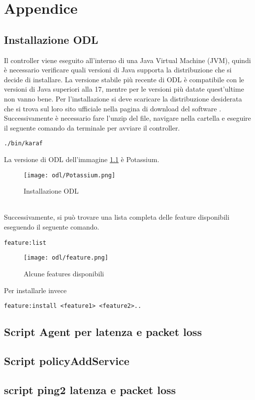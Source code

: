\chapter{Appendice}

\section {Installazione ODL}
Il controller viene eseguito all'interno di una Java Virtual Machine (JVM), quindi è necessario verificare quali versioni di Java supporta la distribuzione che si decide di installare.
La versione stabile più recente di ODL è compatibile con le versioni di Java superiori alla 17, mentre per le versioni più datate quest'ultime non vanno bene. 
Per l'installazione si deve scaricare la distribuzione desiderata che si trova sul loro sito ufficiale nella pagina di download del software \cite{InstallODL}.
Successivamente è necessario fare l'unzip del file, navigare nella cartella e eseguire il seguente comando da terminale per avviare il controller.
\begin{lstlisting}[language=CLI]
./bin/karaf
\end{lstlisting}
La versione di ODL dell'immagine \ref{fig:installazione} è Potassium.
\begin{figure}[h]
    \centering
   \texttt{[image: odl/Potassium.png]}
    \caption{Installazione ODL}
    \label{fig:installazione}
\end{figure}
\\Successivamente, si può trovare una lista completa delle feature disponibili eseguendo il seguente comando.
\begin{lstlisting}[language=CLI]
feature:list
\end{lstlisting}
\begin{figure}[h]
    \centering
   \texttt{[image: odl/feature.png]}
    \caption{Alcune features disponibili}
    \label{fig:feature}
\end{figure}
Per installarle invece 
\begin{lstlisting}[language=CLI]
feature:install <feature1> <feature2>..
\end{lstlisting}

\section{Script Agent per latenza e packet loss}
\section{Script policyAddService}
\section{script ping2 latenza e packet loss}